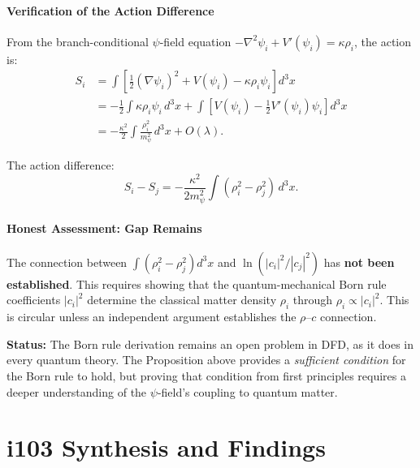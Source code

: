 \documentclass[11pt,a4paper]{article}
\theoremstyle{remark}
\begin{document}
\subsection{Verification of the Action Difference}

From the branch-conditional $\psi$-field equation
$-\nabla^2\psi_i + V'(\psi_i) = \kappa\rho_i$, the action is:
\begin{align}
S_i &= \int\left[\frac{1}{2}(\nabla\psi_i)^2 + V(\psi_i) - \kappa\rho_i\psi_i\right]d^3x \\
&= -\frac{1}{2}\int \kappa\rho_i\psi_i\,d^3x + \int\left[V(\psi_i) - \frac{1}{2}V'(\psi_i)\psi_i\right]d^3x \\
&= -\frac{\kappa^2}{2}\int \frac{\rho_i^2}{m_\psi^2}\,d^3x + O(\lambda).
\end{align}

The action difference:
\begin{equation}
S_i - S_j = -\frac{\kappa^2}{2m_\psi^2}\int(\rho_i^2 - \rho_j^2)\,d^3x.
\end{equation}

\subsection{Honest Assessment: Gap Remains}

\begin{tcolorbox}[colback=red!5!white, colframe=dfdred,
  title=Born Rule: Incomplete]
The connection between $\int(\rho_i^2 - \rho_j^2)d^3x$ and
$\ln(|c_i|^2/|c_j|^2)$ has \textbf{not been established}. This requires
showing that the quantum-mechanical Born rule coefficients $|c_i|^2$
determine the classical matter density $\rho_i$ through $\rho_i \propto |c_i|^2$.
This is circular unless an independent argument establishes the $\rho$--$c$ connection.

\textbf{Status:} The Born rule derivation remains an open problem in DFD,
as it does in every quantum theory. The Proposition above provides a
\emph{sufficient condition} for the Born rule to hold, but proving
that condition from first principles requires a deeper understanding
of the $\psi$-field's coupling to quantum matter.
\end{tcolorbox}


\newpage
\part{i103 Synthesis and Findings}
\label{part:synthesis}
\end{document}
